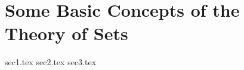 \chapter{Some Basic Concepts of the Theory of Sets}\label{ch:1.2}

{sec1.tex}
{sec2.tex}
{sec3.tex}
